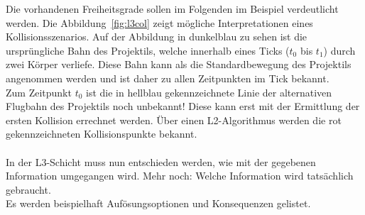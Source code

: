 Die vorhandenen Freiheitsgrade sollen im Folgenden im Beispiel verdeutlicht werden. Die Abbildung~\ref{fig:l3col} zeigt mögliche Interpretationen eines Kollisionsszenarios.
Auf der Abbildung in dunkelblau zu sehen ist die ursprüngliche Bahn des Projektils, welche innerhalb eines Ticks ($t_0$ bis $t_1$) durch zwei Körper verliefe. Diese Bahn kann als die Standardbewegung des Projektils angenommen werden und ist daher zu allen Zeitpunkten im Tick bekannt.\\
Zum Zeitpunkt $t_0$ ist die in hellblau gekennzeichnete Linie der alternativen Flugbahn des Projektils noch unbekannt! Diese kann erst mit der Ermittlung der ersten Kollision errechnet werden.
Über einen L2-Algorithmus werden die rot gekennzeichneten Kollisionspunkte bekannt.\\
\\
In der L3-Schicht muss nun entschieden werden, wie mit der gegebenen Information umgegangen wird. Mehr noch: Welche Information wird tatsächlich gebraucht.\\
Es werden beispielhaft Aufösungsoptionen und Konsequenzen gelistet.

